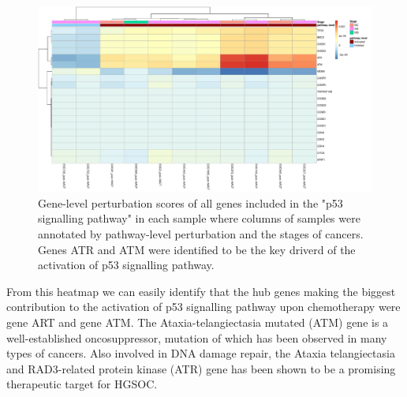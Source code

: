 \documentclass[9pt,a4paper,]{extarticle}
\newenvironment{Shaded}{\begin{snugshade}}{\end{snugshade}}
\newcommand{\AttributeTok}[1]{\textcolor[rgb]{0.77,0.63,0.00}{#1}}
\newcommand{\DecValTok}[1]{\textcolor[rgb]{0.00,0.00,0.81}{#1}}
\newcommand{\FunctionTok}[1]{\textcolor[rgb]{0.00,0.00,0.00}{#1}}
\newcommand{\NormalTok}[1]{#1}
\newcommand{\OtherTok}[1]{\textcolor[rgb]{0.56,0.35,0.01}{#1}}
\newcommand{\SpecialCharTok}[1]{\textcolor[rgb]{0.00,0.00,0.00}{#1}}
\newcommand{\StringTok}[1]{\textcolor[rgb]{0.31,0.60,0.02}{#1}}
\begin{document}
\begin{Shaded}
\end{Shaded}

\begin{figure}

{\centering \includegraphics[width=1\linewidth]{sSNAPPY_paper_files/figure-latex/Figure5-1} 

}

\caption{Gene-level perturbation scores of all genes included in the "p53 signalling pathway" in each sample where columns of samples were annotated by pathway-level perturbation and the stages of cancers. Genes ATR and ATM were identified to be the key driverd of the activation of p53 signalling pathway. }\label{fig:Figure5}
\end{figure}

From this heatmap we can easily identify that the hub genes making the biggest contribution to the activation of p53 signalling pathway upon chemotherapy were gene ART and gene ATM. The Ataxia-telangiectasia mutated (ATM) gene is a well-established oncosuppressor\citep{Moslemi2021}, mutation of which has been observed in many types of cancers\citep{Choi2016}. Also involved in DNA damage repair, the Ataxia telangiectasia and RAD3-related protein kinase (ATR) gene has been shown to be a promising therapeutic target for HGSOC\citep{Li2022}.
\end{document}
